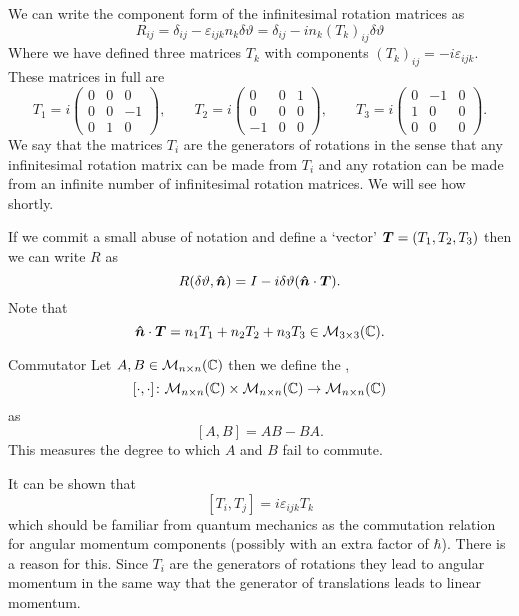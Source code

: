 We can write the component form of the infinitesimal rotation matrices as
\[R_{ij} = \delta_{ij} - \varepsilon_{ijk}n_k\delta\vartheta = \delta_{ij} - in_k(T_k)_{ij}\delta\vartheta\]
Where we have defined three matrices \(T_k\) with components \((T_k)_{ij} = -i\varepsilon_{ijk}\).
These matrices in full are
\[
T_1 = i
\begin{pmatrix}
    0 & 0 & 0\\
    0 & 0 & -1\\
    0 & 1 & 0
\end{pmatrix}
, \qquad T_2 = i
\begin{pmatrix}
    0 & 0 & 1\\
    0 & 0 & 0\\
    -1 & 0 & 0
\end{pmatrix}
, \qquad T_3 = i
\begin{pmatrix}
    0 & -1 & 0\\
    1 & 0 & 0\\
    0 & 0 & 0
\end{pmatrix}
.
\]
We say that the matrices \(T_i\) are the generators of rotations in the sense that any infinitesimal rotation matrix can be made from \(T_i\) and any rotation can be made from an infinite number of infinitesimal rotation matrices.
We will see how shortly.

If we commit a small abuse of notation and define a `vector' \(\bm{T} = (T_1, T_2, T_3)\) then we can write \(R\) as
\[R(\delta\vartheta, \bm{\hat{n}}) = I - i\delta\vartheta (\bm{\hat{n}}\cdot\bm{T}).\]
Note that
\[\bm{\hat{n}}\cdot\bm{T} = n_1T_1 + n_2T_2 + n_3T_3 \in\mathcal{M}_{{3}\times{3}}({\mathbb{C}}).\]

\begin{definition}{Commutator}{}
    Let \(A, B\in\mathcal{M}_{{n}\times{n}}({\mathbb{C}})\) then we define the , 
    \[[\cdot, \cdot]\colon \mathcal{M}_{{n}\times{n}}({\mathbb{C}})\times \mathcal{M}_{{n}\times{n}}({\mathbb{C}}) \to \mathcal{M}_{{n}\times{n}}({\mathbb{C}})\]
    as
    \[[A, B] = AB - BA.\]
    This measures the degree to which \(A\) and \(B\) fail to commute.
\end{definition}
It can be shown that
\[[T_i, T_j] = i\varepsilon_{ijk}T_k\]
which should be familiar from quantum mechanics as the commutation relation for angular momentum components (possibly with an extra factor of \(\hbar\)).
There is a reason for this.
Since \(T_i\) are the generators of rotations they lead to angular momentum in the same way that the generator of translations leads to linear momentum.

